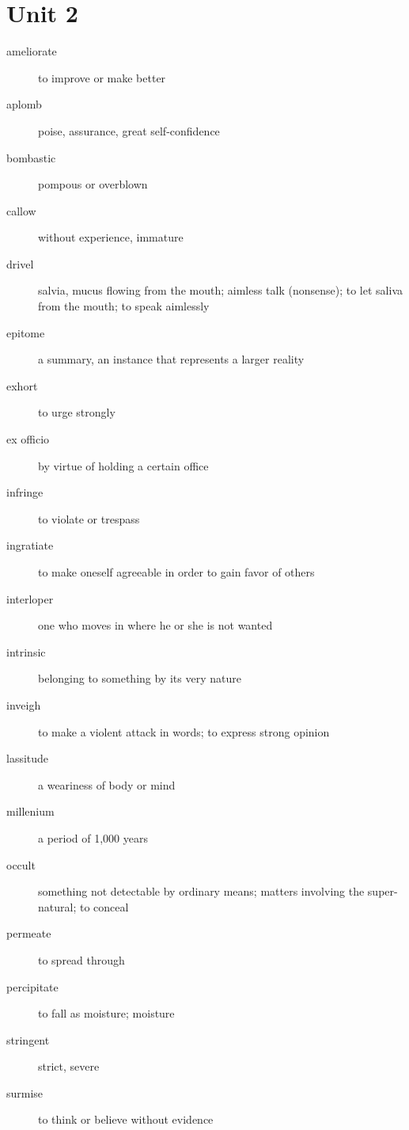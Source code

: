 \section{Unit 2}
\begin{description}
  \item[ameliorate] to improve or make better
  \item[aplomb] poise, assurance, great self-confidence
  \item[bombastic] pompous or overblown
  \item[callow] without experience, immature
  \item[drivel] salvia, mucus flowing from the mouth; aimless talk (nonsense);
    to let saliva from the mouth; to speak aimlessly
  \item[epitome] a summary, an instance that represents a larger reality
  \item[exhort] to urge strongly
  \item[ex officio] by virtue of holding a certain office
  \item[infringe] to violate or trespass
  \item[ingratiate] to make oneself agreeable in order to gain favor of others
  \item[interloper] one who moves in where he or she is not wanted
  \item[intrinsic] belonging to something by its very nature
  \item[inveigh] to make a violent attack in words; to express strong opinion
  \item[lassitude] a weariness of body or mind
  \item[millenium] a period of 1,000 years
  \item[occult] something not detectable by ordinary means; matters involving
    the super-natural; to conceal
  \item[permeate] to spread through
  \item[percipitate] to fall as moisture; moisture
  \item[stringent] strict, severe
  \item[surmise] to think or believe without evidence
\end{description}

